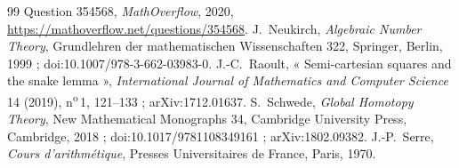 \documentclass[11pt]{article}
\theoremstyle{plain}
\theoremstyle{definition}
\theoremstyle{plain}
\theoremstyle{definition}
\theoremstyle{remark}
\renewcommand{\_}{\bkunderscore\allowbreak}
\begin{document}
\begin{thebibliography}{99}
 Question 354568, \emph{MathOverflow}, 2020, \url{https://mathoverflow.net/questions/354568}.
 J.~Neukirch, \emph{Algebraic Number Theory}, Grundlehren der mathematischen Wissenschaften 322, Springer, Berlin, 1999 ; doi:10.1007/978-3-662-03983-0.
 J.-C.~Raoult, « \textenglish{Semi-cartesian squares and the snake lemma} », \emph{International Journal of Mathematics and Computer Science} 14 (2019), n\textsuperscript{o}\,1, 121--133 ; arXiv:1712.01637.
 S.~Schwede, \emph{Global Homotopy Theory}, New Mathematical Monographs 34, Cambridge University Press, Cambridge, 2018 ; doi:10.1017/9781108349161 ; arXiv:1802.09382.
 J.-P.~Serre, \emph{Cours d'arithmétique}, Presses Universitaires de France, Paris, 1970.
\end{thebibliography}
\end{document}
